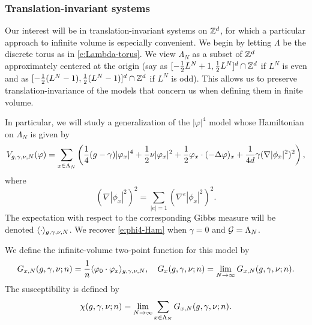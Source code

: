 \subsubsection{Translation-invariant systems}

Our interest will be in translation-invariant systems on ${ {{\mathbb Z}}^d }$, for which a particular
approach to infinite volume is especially convenient. We begin by letting $\Lambda$
be the discrete torus as in \eqref{e:Lambda-torus}. We view $\Lambda_N$
as a subset of ${ {{\mathbb Z}}^d }$ approximately centered at the origin (say as
$[-\frac12 L^N+1,\frac12 L^N]^d \cap {\mathbb Z}^d$ if $L^N$ is even
and as $[-\frac12 (L^N-1), \frac12 (L^N-1)]^d \cap {\mathbb Z}^d$ if $L^N$ is odd). This allows us to preserve
translation-invariance of the models that concern us when defining them in finite volume.

In particular, we will study a generalization of the $|\varphi|^4$ model whose Hamiltonian
on $\Lambda_N$ is given by
\begin{equation}
\label{e:Vdef1}
V_{g,\gamma,\nu,N}(\varphi)
	=
\sum_{x\in\Lambda_N}
\left(
	\frac{1}{4} (g - \gamma) |\varphi_x|^4
		+
	\frac{1}{2} \nu |\varphi_x|^2
		+
	\frac{1}{2} \varphi_x \cdot (-\Delta \varphi)_x
		+
	\frac{1}{4 d} \gamma (\nabla |\phi_x|^2)^2
\right),
\end{equation}
where
\begin{equation}
(\nabla |\phi_x|^2)^2
	=
\sum_{|e|=1} (\nabla^e |\phi_x|^2)^2.
\end{equation}
The expectation with respect to the corresponding Gibbs measure will
be denoted $\langle\cdot\rangle_{g,\gamma,\nu,N}$.
We recover \eqref{e:phi4-Ham} when $\gamma = 0$ and $\mathcal{G} = \Lambda_N$.

We define the infinite-volume two-point function for this model by
\begin{equation}
\label{e:two-point-function-phi4}
G_{x, N}(g,\gamma,\nu; n)
	=
\frac{1}{n} \langle \varphi_0 \cdot \varphi_x \rangle_{g,\gamma,\nu,N},
	\quad
G_x(g,\gamma,\nu; n)
	=
\lim_{N \rightarrow \infty} G_{x, N}(g,\gamma,\nu; n).
\end{equation}
The susceptibility is defined by
\begin{equation}
\label{e:susceptibility-def}
\chi(g, \gamma, \nu; n)
	=
\lim_{N\rightarrow\infty} \sum_{x\in\Lambda_N} G_{x,N}(g, \gamma, \nu; n).
\end{equation}


